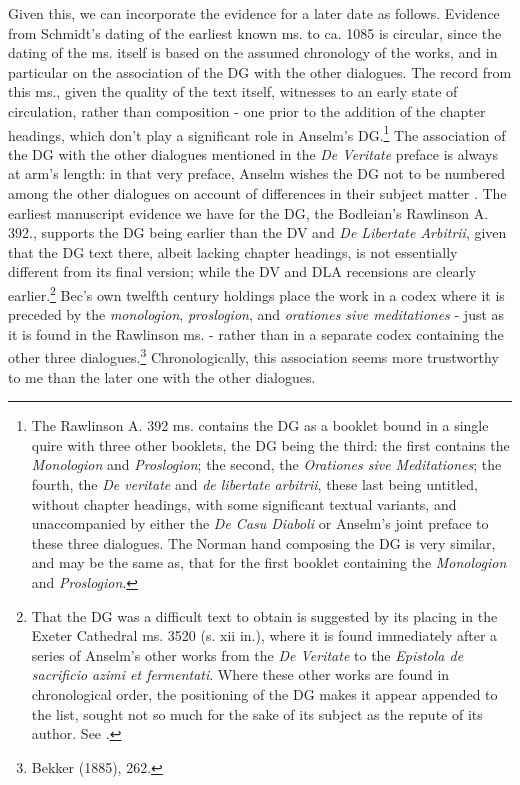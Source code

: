 \documentclass[]{article}
\begin{document}
Given this, we can incorporate the evidence for a later date as follows. Evidence from Schmidt's dating of the earliest known ms. to ca. 1085 is circular, since the dating of the ms. itself is based on the assumed chronology of the works, and in particular on the association of the DG with the other dialogues. The record from this ms., given the quality of the text itself, witnesses to an early state of circulation, rather than composition - one prior to the addition of the chapter headings, which don't play a significant role in Anselm's DG.\footnote{The Rawlinson A. 392 ms. contains the DG as a booklet bound in a single quire with three other booklets, the DG being the third: the first contains the \textit{Monologion} and \textit{Proslogion}; the second, the \textit{Orationes sive Meditationes}; the fourth, the \textit{De veritate} and \textit{de libertate arbitrii}, these last being untitled, without chapter headings, with some significant textual variants, and unaccompanied by either the \textit{De Casu Diaboli} or Anselm's joint preface to these three dialogues. The Norman hand composing the DG is very similar, and may be the same as, that for the first booklet containing the \textit{Monologion} and \textit{Proslogion}.} The association of the DG with the other dialogues mentioned in the \textit{De Veritate} preface is always at arm's length: in that very preface, Anselm wishes the DG not to be numbered among the other dialogues on account of differences in their subject matter \cite[DV prol.]{AnselmDV}. The earliest manuscript evidence we have for the DG, the Bodleian's Rawlinson A. 392., supports the DG being earlier than the DV and \textit{De Libertate Arbitrii}, given that the DG text there, albeit lacking chapter headings, is not essentially different from its final version; while the DV and DLA recensions are clearly earlier.\footnote{That the DG was a difficult text to obtain is suggested by its placing in the Exeter Cathedral ms. 3520 (s. xii in.), where it is found immediately after a series of Anselm's other works from the \textit{De Veritate} to the \textit{Epistola de sacrificio azimi et fermentati}. Where these other works are found in chronological order, the positioning of the DG makes it appear appended to the list, sought not so much for the sake of its subject as the repute of its author. See \cite[p. 85]{Sharpe2009}.} Bec's own twelfth century holdings place the work in a codex where it is preceded by the \textit{monologion}, \textit{proslogion}, and \textit{orationes sive meditationes} - just as it is found in the Rawlinson ms. - rather than in a separate codex containing the other three dialogues.\footnote{Bekker (1885), 262.} Chronologically, this association seems more trustworthy to me than the later one with the other dialogues.
\end{document}
